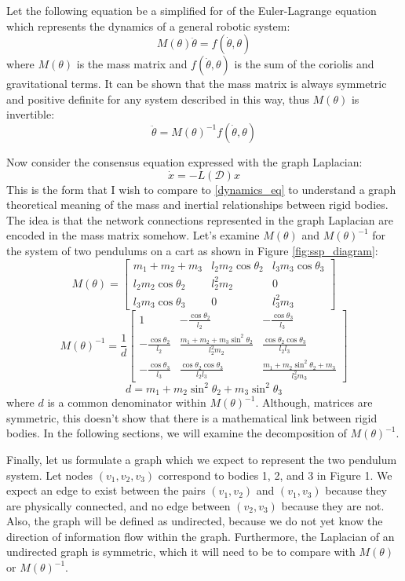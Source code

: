 \documentclass[conference]{IEEEtran}
\begin{document}
Let the following equation be a simplified for of the Euler-Lagrange equation which represents the dynamics of a general robotic system:
$$
M(\theta)\ddot{\theta}=f(\dot{\theta},\theta)
$$
where $M(\theta)$ is the mass matrix and $f(\dot{\theta},\theta)$ is the sum of the coriolis and gravitational terms. It can be shown that the mass matrix is always symmetric and positive definite for any system described in this way, thus $M(\theta)$ is invertible:
\begin{equation}
    \label{dynamics_eq}
    \ddot{\theta}=M(\theta)^{-1}f(\dot{\theta},\theta)
\end{equation}

Now consider the consensus equation expressed with the graph Laplacian:
$$
\dot{x}=-L(\mathcal{D})x
$$
This is the form that I wish to compare to \eqref{dynamics_eq} to understand a graph theoretical meaning of the mass and inertial relationships between rigid bodies. The idea is that the network connections represented in the graph Laplacian are encoded in the mass matrix somehow. Let's examine $M(\theta)$ and $M(\theta)^{-1}$ for the system of two pendulums on a cart as shown in Figure \ref{fig:ssp_diagram}:
$$
M(\theta)=\left[\begin{matrix}m_{1} + m_{2} + m_{3} & l_{2} m_{2} \cos{\theta_2} & l_{3} m_{3} \cos{\theta_3}\\l_{2} m_{2} \cos{\theta_2} & l_{2}^{2} m_{2} & 0\\l_{3} m_{3} \cos{\theta_3} & 0 & l_{3}^{2} m_{3}\end{matrix}\right]
$$
$$
M(\theta)^{-1}=\frac{1}{d}\begin{bmatrix}
    1 & - \frac{\cos{\theta_2}}{l_{2}} & - \frac{\cos{\theta_3}}{l_{3}}\\
    -\frac{\cos{\theta_2}}{l_{2}} & \frac{m_{1} + m_{2} + m_{3} \sin^{2}{\theta_2}}{l_{2}^{2} m_{2}} & \frac{\cos{\theta_2} \cos{\theta_3}}{l_{2} l_{3}}\\
    - \frac{\cos{\theta_3}}{l_{3}} & \frac{\cos{\theta_2} \cos{\theta_3}}{l_{2} l_{3}} & \frac{m_{1} + m_{2} \sin^{2}{\theta_2} + m_{3}}{l_{3}^{2} m_{3}}
\end{bmatrix}
$$
$$
d=m_{1} + m_{2} \sin^{2}{\theta_2} + m_{3} \sin^{2}{\theta_3}
$$
where $d$ is a common denominator within $M(\theta)^{-1}$. Although, matrices are symmetric, this doesn't show that there is a mathematical link between rigid bodies. In the following sections, we will examine the decomposition of $M(\theta)^{-1}$.

Finally, let us formulate a graph which we expect to represent the two pendulum system. Let nodes $(v_1, v_2, v_3)$ correspond to bodies 1, 2, and 3 in Figure 1. We expect an edge to exist between the pairs $(v_1, v_2)$ and $(v_1, v_3)$ because they are physically connected, and no edge between $(v_2, v_3)$ because they are not. Also, the graph will be defined as undirected, because we do not yet know the direction of information flow within the graph. Furthermore, the Laplacian of an undirected graph is symmetric, which it will need to be to compare with $M(\theta)$ or $M(\theta)^{-1}$.
\end{document}
